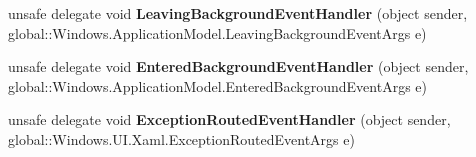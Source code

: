 \begin{DoxyCompactItemize}
\item 
\mbox{\label{namespace_windows_1_1_u_i_1_1_xaml_a31d43d5b181fc9f34c8f234a810b42ae}} 
unsafe delegate void {\bfseries Leaving\+Background\+Event\+Handler} (object sender, global\+::\+Windows.\+Application\+Model.\+Leaving\+Background\+Event\+Args e)
\item 
\mbox{\label{namespace_windows_1_1_u_i_1_1_xaml_a43a76f9b9bfcbbca52194bd579f128b1}} 
unsafe delegate void {\bfseries Entered\+Background\+Event\+Handler} (object sender, global\+::\+Windows.\+Application\+Model.\+Entered\+Background\+Event\+Args e)
\item 
\mbox{\label{namespace_windows_1_1_u_i_1_1_xaml_aa7f4a788d84a9e42a0b65f46f800d1d3}} 
unsafe delegate void {\bfseries Exception\+Routed\+Event\+Handler} (object sender, global\+::\+Windows.\+U\+I.\+Xaml.\+Exception\+Routed\+Event\+Args e)
\end{DoxyCompactItemize}
